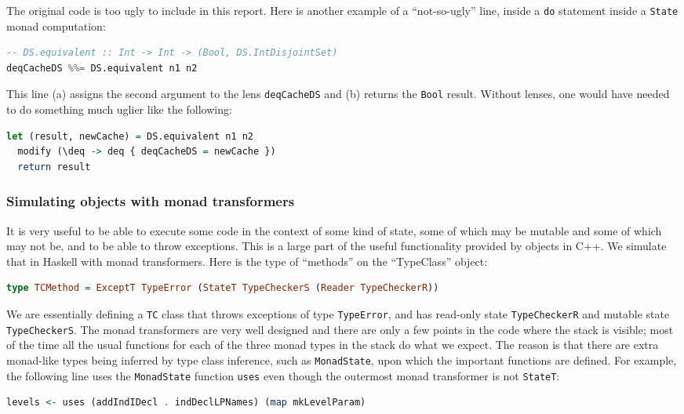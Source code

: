 \documentclass{article}
\begin{document}
\begin{spacing}{1.1}
The original code is too ugly to include in this report. Here is another example of a ``not-so-ugly'' line, inside a \lstinline{do} statement inside a \lstinline{State} monad computation:
\begin{lstlisting}[language=Haskell]
-- DS.equivalent :: Int -> Int -> (Bool, DS.IntDisjointSet)
deqCacheDS %%= DS.equivalent n1 n2
\end{lstlisting}
This line (a) assigns the second argument to the lens \lstinline{deqCacheDS} and (b) returns the \lstinline{Bool} result. Without lenses, one would have needed to do something much uglier like the following:
\begin{lstlisting}[language=Haskell]
  let (result, newCache) = DS.equivalent n1 n2
  modify (\deq -> deq { deqCacheDS = newCache })
  return result
\end{lstlisting}

\subsubsection{Simulating objects with monad transformers}

It is very useful to be able to execute some code in the context of some kind of state, some of which may be mutable and some of which may not be, and to be able to throw exceptions. This is a large part of the useful functionality provided by objects in C++. We simulate that in Haskell with monad transformers. Here is the type of ``methods'' on the ``TypeClass'' object:
\begin{lstlisting}[language=Haskell]
type TCMethod = ExceptT TypeError (StateT TypeCheckerS (Reader TypeCheckerR))
\end{lstlisting}

We are essentially defining a \lstinline{TC} class that throws exceptions of type \lstinline{TypeError}, and has read-only state \lstinline{TypeCheckerR} and mutable state \lstinline{TypeCheckerS}. The monad transformers are very well designed and there are only a few points in the code where the stack is visible; most of the time all the usual functions for each of the three monad types in the stack do what we expect. The reason is that there are extra monad-like types being inferred by type class inference, such as \lstinline{MonadState}, upon which the important functions are defined. For example, the following line uses the \lstinline{MonadState} function \lstinline{uses} even though the outermost monad transformer is not \lstinline{StateT}:

\begin{lstlisting}[language=Haskell]
levels <- uses (addIndIDecl . indDeclLPNames) (map mkLevelParam)
\end{lstlisting}


\end{spacing}
\end{document}
